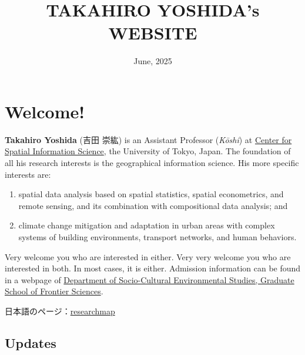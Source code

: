 \documentclass[
]{book}
\title{TAKAHIRO YOSHIDA's WEBSITE}
\author{}
\date{\vspace{-2.5em}June, 2025}
\providecommand{\tightlist}{%
  \setlength{\itemsep}{0pt}\setlength{\parskip}{0pt}}
\begin{document}
\maketitle

{
\setcounter{tocdepth}{1}
\tableofcontents
}
\chapter*{Welcome!}\label{welcome}

\textbf{Takahiro Yoshida} (吉田 崇紘) is an Assistant Professor (\emph{Kōshi}) at \href{https://www.csis.u-tokyo.ac.jp/}{Center for Spatial Information Science}, the University of Tokyo, Japan. The foundation of all his research interests is the geographical information science. His more specific interests are:

\begin{enumerate}
\def\labelenumi{(\arabic{enumi})}
\tightlist
\item
  spatial data analysis based on spatial statistics, spatial econometrics, and remote sensing, and its combination with compositional data analysis; and
\item
  climate change mitigation and adaptation in urban areas with complex systems of building environments, transport networks, and human behaviors.
\end{enumerate}

Very welcome you who are interested in either. Very very welcome you who are interested in both. In most cases, it is either. Admission information can be found in a webpage of \href{https://sbk.k.u-tokyo.ac.jp/index_e.html}{Department of Socio-Cultural Environmental Studies, Graduate School of Frontier Sciences}.

日本語のページ：\href{https://researchmap.jp/yoshida.takahiro}{researchmap}

\section*{Updates}\label{updates}
\end{document}
